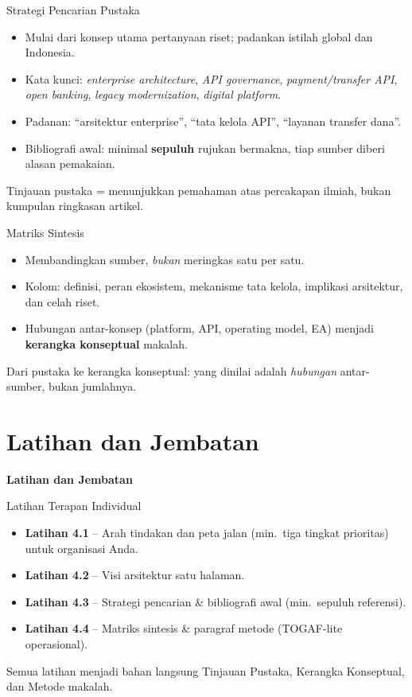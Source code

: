 \documentclass[aspectratio=169, table]{beamer}
\newcommand{\sectionframe}[1]{%
  \begin{frame}{\hfill}
    \centering
    \Huge{\textbf{#1}}
  \end{frame}
}
\newcommand{\takeaway}[1]{%
  \vspace{4pt}
  {\footnotesize #1}
}
\begin{document}
\begin{frame}{Strategi Pencarian Pustaka}
  \vspace{6pt}
  \begin{itemize}
    \item Mulai dari konsep utama pertanyaan riset; padankan istilah global
          dan Indonesia.
    \item Kata kunci: \emph{enterprise architecture}, \emph{API governance},
          \emph{payment/transfer API}, \emph{open banking},
          \emph{legacy modernization}, \emph{digital platform}.
    \item Padanan: ``arsitektur enterprise'', ``tata kelola API'', ``layanan
          transfer dana''.
    \item Bibliografi awal: minimal \textbf{sepuluh} rujukan bermakna, tiap
          sumber diberi alasan pemakaian.
  \end{itemize}
  \takeaway{Tinjauan pustaka = menunjukkan pemahaman atas percakapan ilmiah,
  bukan kumpulan ringkasan artikel.}
\end{frame}

\begin{frame}{Matriks Sintesis}
  \vspace{6pt}
  \begin{itemize}
    \item Membandingkan sumber, \emph{bukan} meringkas satu per satu.
    \item Kolom: definisi, peran ekosistem, mekanisme tata kelola, implikasi
          arsitektur, dan celah riset.
    \item Hubungan antar-konsep (platform, API, operating model, EA) menjadi
          \textbf{kerangka konseptual} makalah.
  \end{itemize}
  \takeaway{Dari pustaka ke kerangka konseptual: yang dinilai adalah
  \emph{hubungan} antar-sumber, bukan jumlahnya.}
\end{frame}

\section{Latihan dan Jembatan}
\sectionframe{Latihan dan Jembatan}

\begin{frame}{Latihan Terapan Individual}
  \vspace{8pt}
  \begin{itemize}
    \item \textbf{Latihan 4.1} -- Arah tindakan dan peta jalan (min.\ tiga
          tingkat prioritas) untuk organisasi Anda.
    \item \textbf{Latihan 4.2} -- Visi arsitektur satu halaman.
    \item \textbf{Latihan 4.3} -- Strategi pencarian \& bibliografi awal (min.\
          sepuluh referensi).
    \item \textbf{Latihan 4.4} -- Matriks sintesis \& paragraf metode
          (TOGAF-lite operasional).
  \end{itemize}
  \takeaway{Semua latihan menjadi bahan langsung Tinjauan Pustaka, Kerangka
  Konseptual, dan Metode makalah.}
\end{frame}
\end{document}
